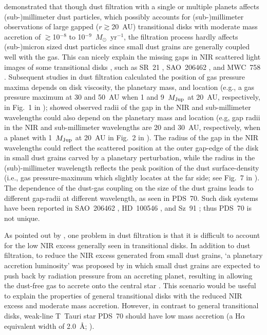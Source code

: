 \documentclass[apj]{emulateapj-rtx4}
\begin{document}
    \citet{zhu12} demonstrated that though dust filtration with a single or multiple planets affects 
    (sub-)millimeter dust particles, which possibly accounts for (sub-)millimeter observations of large
    gapped ($r \gtrsim$20~AU) transitional disks with moderate mass accretion of $\gtrsim$10$^{-8}$ to 10$^{-9}$~$M_{\odot}$~yr$^{-1}$,
    the filtration process hardly affects (sub-)micron sized dust particles since small dust 
    grains are generally coupled well with the gas.
    This can nicely explain the missing gaps in NIR scattered light images of some transitional disks \citep{dong12a},
    such as SR~21 \citep{foll13}, SAO~206462 \citep{muto12}, and MWC~758 \citep{grad13}.
  Subsequent studies in dust filtration \citep{pini12} calculated the position of gas pressure maxima depends
  on disk viscosity, the planetary mass, and location (e.g., a gas pressure maximum at 30 and 50~AU when 
  1 and 9~$M_{\rm Jup}$ at 20~AU, respectively, 
  in Fig.~1 in \citealt{pini12}); \citet{deju13} showed observed radii of the gap in the NIR and sub-millimeter wavelengths could also 
  depend on the planetary mass and location (e.g, gap radii in the NIR and sub-millimeter wavelengths are 20 and 30~AU, respectively,
  when a planet with 1~$M_{\rm Jup}$ at 20~AU in Fig.~2 in \citealt{deju13}). The radius of the gap in the NIR wavelengths could reflect
  the scattered position at the outer gap-edge of the disk in small dust grains carved by a planetary perturbation, 
  while the radius in the 
  (sub)-millimeter wavelength reflects the peak position of the dust surface-density (i.e., gas pressure-maximum which slightly locates 
  at the far side; see Fig.~7 in \citealt{deju13}). 
  The dependence of the dust-gas coupling on the size of the dust grains leads
  to different gap-radii at different wavelength, as seen in PDS~70.
  Such disk systems have been reported in SAO~206462 \citep{garu13,pere14}, HD~100546 \citep{aven14,pine14}, 
  and Sz~91 \citep{tsuk14}; thus PDS~70 is not unique.
  
  As pointed out by \citet{zhu12}, one problem in dust filtration is that it is difficult 
  to account for the low NIR excess generally seen in transitional disks.
  In addition to dust filtration, to reduce the NIR excess generated from small dust grains, `a planetary accretion luminosity' 
  was proposed by \citet{owen14} in which small dust grains are expected to push back by radiation pressure from an accreting planet, 
  resulting in allowing the dust-free gas to accrete onto the central star \citep{owen14}. This scenario would be useful to explain
  the properties of general transitional disks with the reduced NIR excess and moderate mass accretion. However,
  in contrast to general transitional disks, weak-line T~Tauri star PDS~70 should have low mass accretion (a H$\alpha$ equivalent width
  of 2.0~\AA; \citealt{greg02}). 
\end{document}

